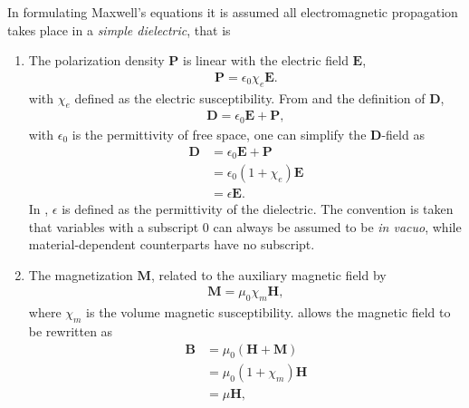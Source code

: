 In formulating Maxwell's equations it is assumed all electromagnetic
propagation takes place in a {\it simple dielectric}, that is
\begin{enumerate}
  \item The polarization density $\mathbf{P}$ is linear with the electric
        field $\mathbf{E}$,
        \begin{align}
          \mathbf{P}=\epsilon_0\chi_e\mathbf{E}.
          \label{eqn:pdensity}
        \end{align}
        with $\chi_e$ defined as the electric susceptibility.  From
         and the definition
        of $\mathbf{D}$,
        \begin{align}
          \mathbf{D}=\epsilon_0\mathbf{E}+\mathbf{P},
          \label{eqn:dfield}
        \end{align}
        with $\epsilon_0$ is the permittivity of free space, one can simplify the
        $\mathbf{D}$-field as
        \begin{align}
          \mathbf{D} & =\epsilon_0\mathbf{E}+\mathbf{P} \\
                     & =\epsilon_0(1+\chi_e)\mathbf{E}  \\
                     & =\epsilon\mathbf{E}.
          \label{eqn:permittivitydangle}
        \end{align}
        In , $\epsilon$ is defined as the
        permittivity of the dielectric.  The convention is taken
        that variables with a subscript $0$ can always be assumed to be
          {\it in vacuo}, while material-dependent counterparts have
        no subscript.
  \item The magnetization $\mathbf{M}$, related to the
        auxiliary magnetic field by
        \begin{align}
          \mathbf{M}=\mu_0\chi_m\mathbf{H},
          \label{eqn:auxfield}
        \end{align}
        where $\chi_m$ is the volume magnetic susceptibility.
         allows the
        magnetic field to be rewritten as
        \begin{align}
          \mathbf{B} & =\mu_0\left(\mathbf{H}+\mathbf{M}\right) \\
                     & =\mu_0\left(1+\chi_m\right)\mathbf{H}    \\
                     & =\mu \mathbf{H},
        \end{align}

\end{enumerate}
